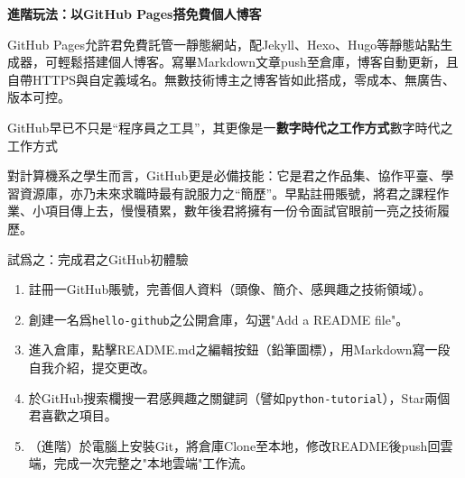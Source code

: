 \textbf{進階玩法：以GitHub Pages搭免費個人博客}\par

GitHub Pages允許君免費託管一靜態網站，配Jekyll、Hexo、Hugo等靜態站點生成器，可輕鬆搭建個人博客。寫畢Markdown文章push至倉庫，博客自動更新，且自帶HTTPS與自定義域名。無數技術博主之博客皆如此搭成，零成本、無廣告、版本可控。


GitHub早已不只是“程序員之工具”，其更像是一\textbf{數字時代之工作方式}數字時代之工作方式

對計算機系之學生而言，GitHub更是必備技能：它是君之作品集、協作平臺、學習資源庫，亦乃未來求職時最有說服力之“簡歷”。早點註冊賬號，將君之課程作業、小項目傳上去，慢慢積累，數年後君將擁有一份令面試官眼前一亮之技術履歷。

\begin{tcbpractice}{試爲之：完成君之GitHub初體驗}
\begin{enumerate}
  \item 註冊一GitHub賬號，完善個人資料（頭像、簡介、感興趣之技術領域）。
  \item 創建一名爲\texttt{hello-\allowbreak github}之公開倉庫，勾選"Add a README file"。
  \item 進入倉庫，點擊README.md之編輯按鈕（鉛筆圖標），用Markdown寫一段自我介紹，提交更改。
  \item 於GitHub搜索欄搜一君感興趣之關鍵詞（譬如\texttt{python-\allowbreak tutorial}），Star兩個君喜歡之項目。
  \item （進階）於電腦上安裝Git，將倉庫Clone至本地，修改README後push回雲端，完成一次完整之"本地雲端"工作流。
\end{enumerate}

\end{tcbpractice}
